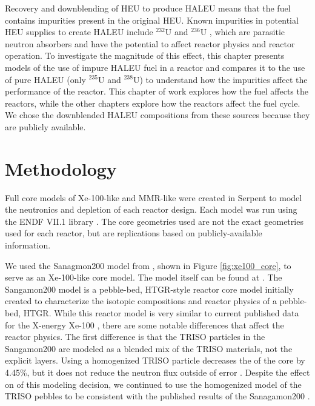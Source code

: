 Recovery and downblending of \gls{HEU} to produce \gls{HALEU} means that 
the fuel contains impurities present in the original
\gls{HEU}. Known impurities in potential \gls{HEU}
supplies to create \gls{HALEU} include $^{232}$U and $^{236}$U
\cite{vaden_isotopic_2018,nelson_foreign_2010},  
which are parasitic neutron absorbers and have the potential to affect 
reactor physics and reactor operation. To investigate the magnitude of this 
effect, this chapter presents models of the use of 
impure \gls{HALEU} fuel in a reactor and compares it to the use of pure 
\gls{HALEU} (only $^{235}$U and $^{238}$U)
to understand how the impurities affect the performance of the reactor.
This chapter of work explores how the fuel affects the reactors, while 
the other chapters explore how the reactors affect the fuel cycle. We chose 
the downblended \gls{HALEU} compositions from these sources because
they are publicly available. 

\section{Methodology}
Full core models of Xe-100-like and \gls{MMR}-like were created in Serpent 
\cite{leppanen_serpent_2014} to model the neutronics and depletion of 
each reactor design. Each model was run using the ENDF VII.1 library
\cite{chadwick_endfb-vii1_2011}. The core geometries used are not 
the exact geometries used for each reactor, but are replications based 
on publicly-available information. 

We used the Sanagmon200 model from \cite{richter_isotopic_2022}, shown in 
Figure \ref{fig:xe100_core}, to serve as an Xe-100-like 
core model. The model itself can be found at \cite{richter_zoerichterphlox_2022}.
The Sangamon200 model is a pebble-bed, \gls{HTGR}-style reactor core model 
initially created to characterize the isotopic compositions and 
reactor physics of a pebble-bed, \gls{HTGR}. While this reactor model 
is very similar to current published data for the X-energy Xe-100
\cite{mulder_overview_2021}, there are some notable differences that affect 
the reactor physics. The first difference is that the \gls{TRISO} particles 
in the Sangamon200 are modeled as a blended mix of the \gls{TRISO} 
materials, not the explicit layers. Using a homogenized \gls{TRISO} particle 
decreases the \keff of the core by 4.45\%, but it does not reduce the 
neutron flux outside of error \cite{richter_isotopic_2022}. Despite 
the effect on \keff of this modeling decision, we continued to use the 
homogenized model of the \gls{TRISO} pebbles to be consistent with the 
published results of the Sanagamon200 \cite{richter_isotopic_2022}. 

